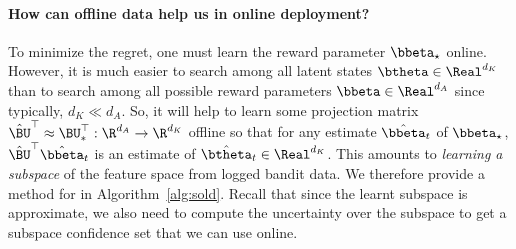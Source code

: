 \paragraph{How can offline data help us in online deployment?} To minimize the regret, one must learn the reward parameter $\bbeta_\star$ online. However, it is much easier to search among all latent states $\btheta \in \Real^{d_K}$ than to search among all possible reward parameters $\bbeta \in \Real^{d_A}$ since typically, $d_K \ll d_A$. So, it will help to learn some projection matrix $\hat{\BU}^\top \approx \BU_*^\top : \R^{d_A} \to \R^{d_K}$ offline so that for any estimate $\hat\bbeta_t$ of $\bbeta_\star$, $\hat \BU^\top \hat \bbeta_t$ is an estimate of $\hat\btheta_t \in \Real^{d_K}$. This amounts to \textit{learning a subspace} of the feature space from logged bandit data. 
We therefore provide a method for  in Algorithm~\ref{alg:sold}. Recall that since the learnt subspace is approximate, we also need to compute the uncertainty over the subspace to get a subspace confidence set that we can use online.
